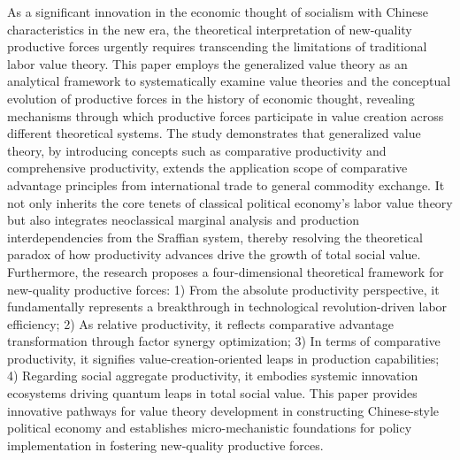 \begin{abstract*}

As a significant innovation in the economic thought of socialism with Chinese characteristics in the new era, the theoretical interpretation of new-quality productive forces urgently requires transcending the limitations of traditional labor value theory. This paper employs the generalized value theory as an analytical framework to systematically examine value theories and the conceptual evolution of productive forces in the history of economic thought, revealing mechanisms through which productive forces participate in value creation across different theoretical systems. The study demonstrates that generalized value theory, by introducing concepts such as comparative productivity and comprehensive productivity, extends the application scope of comparative advantage principles from international trade to general commodity exchange. It not only inherits the core tenets of classical political economy's labor value theory but also integrates neoclassical marginal analysis and production interdependencies from the Sraffian system, thereby resolving the theoretical paradox of how productivity advances drive the growth of total social value. Furthermore, the research proposes a four-dimensional theoretical framework for new-quality productive forces: 1) From the absolute productivity perspective, it fundamentally represents a breakthrough in technological revolution-driven labor efficiency; 2) As relative productivity, it reflects comparative advantage transformation through factor synergy optimization; 3) In terms of comparative productivity, it signifies value-creation-oriented leaps in production capabilities; 4) Regarding social aggregate productivity, it embodies systemic innovation ecosystems driving quantum leaps in total social value. This paper provides innovative pathways for value theory development in constructing Chinese-style political economy and establishes micro-mechanistic foundations for policy implementation in fostering new-quality productive forces.


\end{abstract*}
